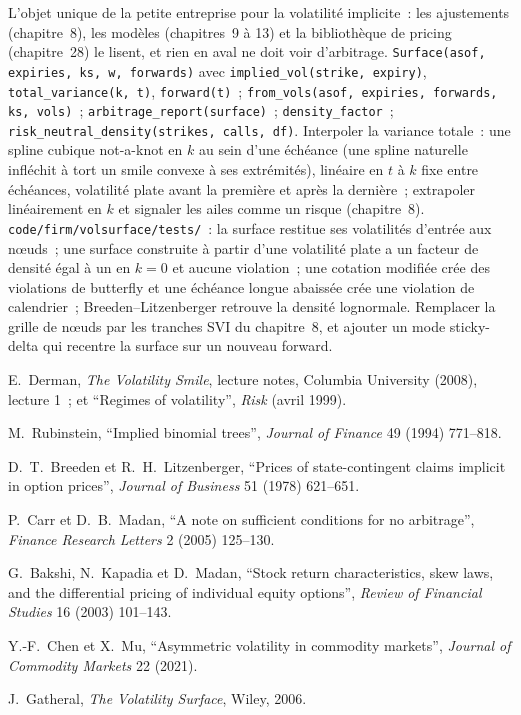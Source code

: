 \begin{build}
 L'objet unique de la petite entreprise pour la volatilité implicite~: les ajustements (chapitre~8),
les modèles (chapitres~9 à 13) et la bibliothèque de pricing (chapitre~28) le lisent, et rien en aval
ne doit voir d'arbitrage.
 \texttt{Surface(asof, expiries, ks, w, forwards)} avec
\texttt{implied\_vol(strike, expiry)}, \texttt{total\_variance(k, t)}, \texttt{forward(t)}~;
\texttt{from\_vols(asof, expiries, forwards, ks, vols)}~; \texttt{arbitrage\_report(surface)}~;
\texttt{density\_factor}~; \texttt{risk\_neutral\_density(strikes, calls, df)}.
 Interpoler la variance totale~: une spline cubique not-a-knot en $k$ au sein d'une échéance
(une spline naturelle infléchit à tort un smile convexe à ses extrémités), linéaire en $t$ à $k$ fixe
entre échéances, volatilité plate avant la première et après la dernière~; extrapoler linéairement en
$k$ et signaler les ailes comme un risque (chapitre~8).
 \texttt{code/firm/volsurface/tests/}~: la surface restitue ses volatilités d'entrée aux nœuds~;
une surface construite à partir d'une volatilité plate a un facteur de densité égal à un
en $k=0$ et aucune violation~; une cotation modifiée crée des violations de butterfly et une échéance longue
abaissée crée une violation de calendrier~; Breeden--Litzenberger retrouve la densité lognormale.
 Remplacer la grille de nœuds par les tranches SVI du chapitre~8, et ajouter un mode
sticky-delta qui recentre la surface sur un nouveau forward.
\end{build}

\begin{omsources}
\item E.~Derman, \emph{The Volatility Smile}, lecture notes, Columbia University (2008),
lecture 1~; et ``Regimes of volatility'', \emph{Risk} (avril 1999).
\item M.~Rubinstein, ``Implied binomial trees'', \emph{Journal of Finance} 49 (1994) 771--818.
\item D.~T.~Breeden et R.~H.~Litzenberger, ``Prices of state-contingent claims implicit in
option prices'', \emph{Journal of Business} 51 (1978) 621--651.
\item P.~Carr et D.~B.~Madan, ``A note on sufficient conditions for no arbitrage'',
\emph{Finance Research Letters} 2 (2005) 125--130.
\item G.~Bakshi, N.~Kapadia et D.~Madan, ``Stock return characteristics, skew laws, and the
differential pricing of individual equity options'', \emph{Review of Financial Studies} 16
(2003) 101--143.
\item Y.-F.~Chen et X.~Mu, ``Asymmetric volatility in commodity markets'', \emph{Journal of
Commodity Markets} 22 (2021).
\item J.~Gatheral, \emph{The Volatility Surface}, Wiley, 2006.
\end{omsources}

